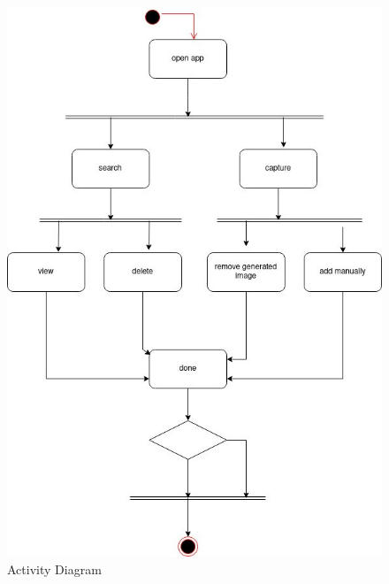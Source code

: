 \begin{figure}[h!]
     \centering
        \includegraphics[scale=0.7]{output/activity.jpg}
        \caption{Activity Diagram}%
     \end{figure}
     \newpage
\newpage
